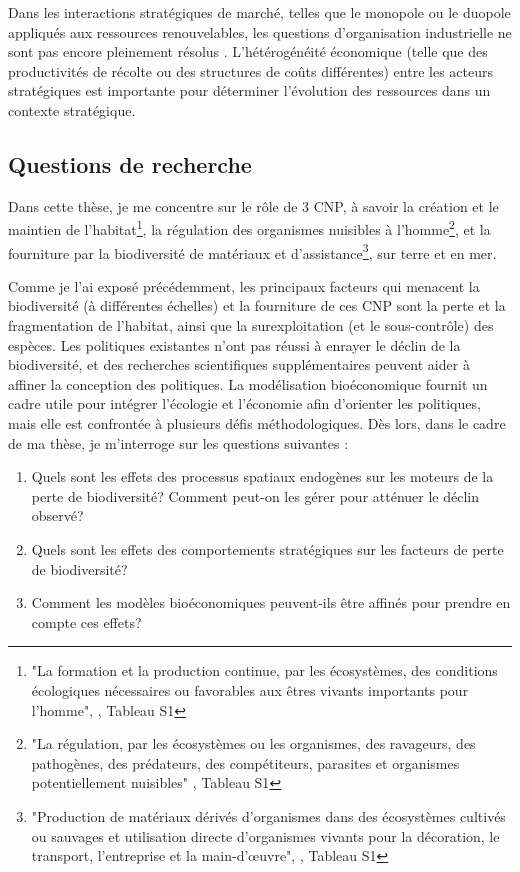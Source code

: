 Dans les interactions stratégiques de marché, telles que le monopole ou le duopole appliqués aux ressources renouvelables, les questions d'organisation industrielle ne sont pas encore pleinement résolus \citep{damania_economics_2007}. L'hétérogénéité économique (telle que des productivités de récolte ou des structures de coûts différentes) entre les acteurs stratégiques est importante pour déterminer l'évolution des ressources dans un contexte stratégique.

\clearpage
{}
{}
\subsection*{Questions de recherche}

 
Dans cette thèse, je me concentre sur le rôle de 3 CNP, à savoir la création et le maintien de l'habitat\footnote{"La formation et la production continue, par les écosystèmes, des conditions écologiques nécessaires ou favorables aux êtres vivants importants pour l'homme", \citep{diaz_2018}, Tableau S1}, la régulation des organismes nuisibles à l'homme\footnote{"La régulation, par les écosystèmes ou les organismes, des ravageurs, des pathogènes, des prédateurs, des compétiteurs, parasites et organismes potentiellement nuisibles" \citep{diaz_2018}, Tableau S1}, et la fourniture par la biodiversité de matériaux et d'assistance\footnote{"Production de matériaux dérivés d'organismes dans des écosystèmes cultivés ou sauvages et utilisation directe d'organismes vivants pour la décoration, le transport, l'entreprise et la main-d'œuvre", \citep{diaz_2018}, Tableau S1}, sur terre et en mer. 

Comme je l'ai exposé précédemment, les principaux facteurs qui menacent la biodiversité (à différentes échelles) et la fourniture de ces CNP sont la perte et la fragmentation de l'habitat, ainsi que la surexploitation (et le sous-contrôle) des espèces. Les politiques existantes n'ont pas réussi à enrayer le déclin de la biodiversité, et des recherches scientifiques supplémentaires peuvent aider à affiner la conception des politiques. La modélisation bioéconomique fournit un cadre utile pour intégrer l'écologie et l'économie afin d'orienter les politiques, mais elle est confrontée à plusieurs défis méthodologiques. Dès lors, dans le cadre de ma thèse, je m'interroge sur les questions suivantes : 
\begin{displayquote}
\begin{enumerate}
\item Quels sont les effets des processus spatiaux endogènes sur les moteurs de la perte de biodiversité? Comment peut-on les gérer pour atténuer le déclin observé?
\item Quels sont les effets des comportements stratégiques sur les facteurs de perte de biodiversité?
\item Comment les modèles bioéconomiques peuvent-ils être affinés pour prendre en compte ces effets?
\end{enumerate}
\end{displayquote}

